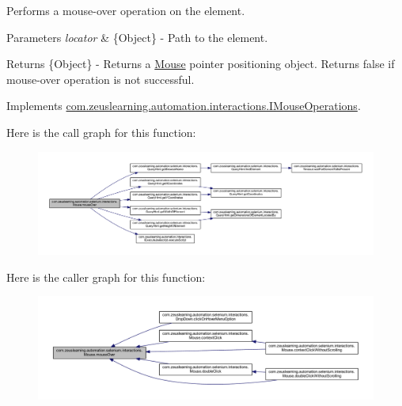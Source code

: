Performs a mouse-\/over operation on the element.


\begin{DoxyParams}{Parameters}
{\em locator} & \{Object\} -\/ Path to the element.\\
\hline
\end{DoxyParams}
\begin{DoxyReturn}{Returns}
\{Object\} -\/ Returns a \hyperlink{classcom_1_1zeuslearning_1_1automation_1_1selenium_1_1interactions_1_1Mouse}{Mouse} pointer positioning object. Returns {\ttfamily false} if mouse-\/over operation is not successful. 
\end{DoxyReturn}


Implements \hyperlink{interfacecom_1_1zeuslearning_1_1automation_1_1interactions_1_1IMouseOperations_a5e9e5bc4ccb27ca23924a3058c686374}{com.\+zeuslearning.\+automation.\+interactions.\+I\+Mouse\+Operations}.

Here is the call graph for this function\+:
\nopagebreak
\begin{figure}[H]
\begin{center}
\leavevmode
\includegraphics[width=350pt]{d0/dfa/classcom_1_1zeuslearning_1_1automation_1_1selenium_1_1interactions_1_1Mouse_ae3becce24a081e1ad2151b383c2d9404_cgraph}
\end{center}
\end{figure}
Here is the caller graph for this function\+:
\nopagebreak
\begin{figure}[H]
\begin{center}
\leavevmode
\includegraphics[width=350pt]{d0/dfa/classcom_1_1zeuslearning_1_1automation_1_1selenium_1_1interactions_1_1Mouse_ae3becce24a081e1ad2151b383c2d9404_icgraph}
\end{center}
\end{figure}
\hypertarget{classcom_1_1zeuslearning_1_1automation_1_1selenium_1_1interactions_1_1Mouse_a0b7f2ca5dafa810dc0a0ec1669f40fef}{}\label{classcom_1_1zeuslearning_1_1automation_1_1selenium_1_1interactions_1_1Mouse_a0b7f2ca5dafa810dc0a0ec1669f40fef} 
